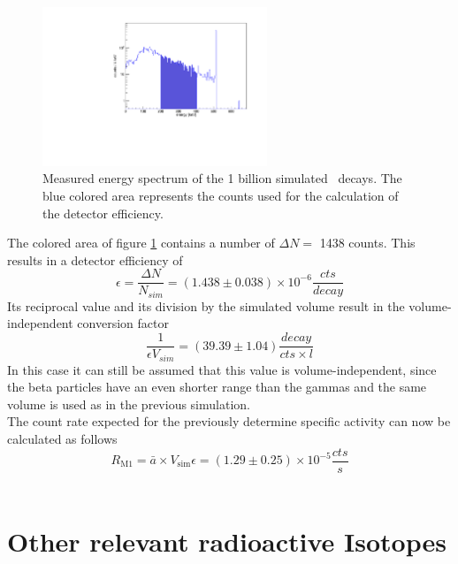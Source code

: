 \documentclass[encoding=utf8,british]{tumphthesis}
\begin{document}
\begin{figure}[t!]
\centering
		\includegraphics[width=0.6\textwidth]{./Bilder/Sim1Phasenraum.pdf}
		\caption{
			Measured energy spectrum of the 1 billion simulated \Kr\ decays. 
			The blue colored area represents the counts used for the calculation of the detector efficiency.
		}
		\label{fig:Sim1Spektrum}
		\vspace{5mm}
\end{figure}


The colored area of figure \ref{fig:Sim1Spektrum} contains a number of $\Delta N =$ 1438 counts.
This results in a detector efficiency of 
\begin{equation*}
\epsilon = \frac{\Delta N}{N_{\unit{sim}}} = (1.438 \pm 0.038) \times 10^{-6} \frac{\unit{cts}}{\unit{decay}}
\end{equation*}
Its reciprocal value and its division by the simulated volume result in the volume-independent conversion factor
\begin{equation*}
\frac{1}{\epsilon V_{\unit{sim}}} = (39.39 \pm 1.04) \frac{\unit{decay}}{\unit{cts \times l}}
\end{equation*}
In this case it can still be assumed that this value is volume-independent, since the beta particles have an even shorter range than the gammas and the same volume is used as in the previous simulation.
\\

The count rate expected for the previously determine specific activity can now be calculated as follows
\begin{equation*}
R_{\mathrm{M1}} = \bar{a} \times V_{\mathrm{sim}} \epsilon =  (1.29\pm0.25) \times 10^{-5} \frac{\unit{cts}}{\unit{s}}
\end{equation*}
\\

\section{Other relevant radioactive Isotopes}
\end{document}

